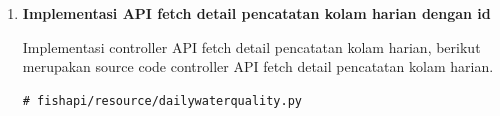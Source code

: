 \begin{enumerate}[1.]
Berikut merupakan hasil test request dari API delete pencatatan kolam harian.

cURL:

\begin{lstlisting}
curl --location --request DELETE 'http://jft.web.id/fishapi/api/dailywaterquality/62e8b800ef4edacc5bb18b05'
\end{lstlisting}

response json:

\begin{lstlisting}
{
  "message": "success delete daily water quality"
}
\end{lstlisting}


\item \textbf{Implementasi API fetch detail pencatatan kolam harian dengan id}

Implementasi controller API fetch detail pencatatan kolam harian, berikut merupakan source code controller API fetch detail pencatatan kolam harian.

\begin{lstlisting}
# fishapi/resource/dailywaterquality.py


\end{lstlisting}
\end{enumerate}

